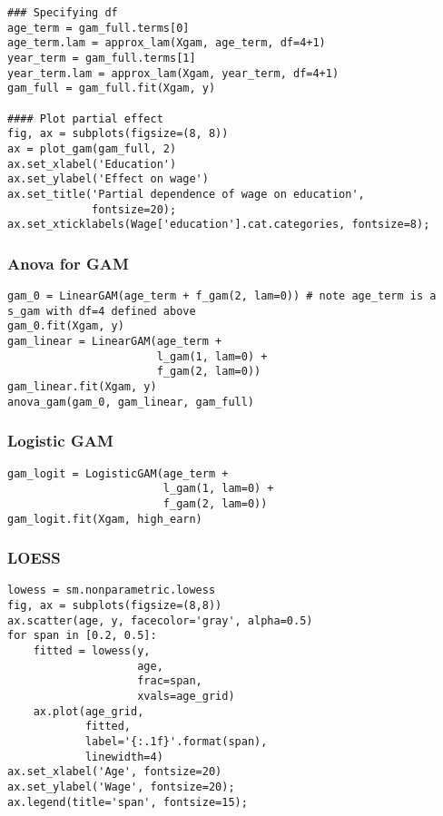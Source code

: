 \documentclass[
  letterpaper,
  DIV=11,
  numbers=noendperiod]{scrreprt}
\begin{document}
\begin{verbatim}
### Specifying df
age_term = gam_full.terms[0]
age_term.lam = approx_lam(Xgam, age_term, df=4+1)
year_term = gam_full.terms[1]
year_term.lam = approx_lam(Xgam, year_term, df=4+1)
gam_full = gam_full.fit(Xgam, y)

#### Plot partial effect
fig, ax = subplots(figsize=(8, 8))
ax = plot_gam(gam_full, 2)
ax.set_xlabel('Education')
ax.set_ylabel('Effect on wage')
ax.set_title('Partial dependence of wage on education',
             fontsize=20);
ax.set_xticklabels(Wage['education'].cat.categories, fontsize=8);
\end{verbatim}

\subsubsection{Anova for GAM}\label{anova-for-gam}

\begin{verbatim}
gam_0 = LinearGAM(age_term + f_gam(2, lam=0)) # note age_term is a s_gam with df=4 defined above 
gam_0.fit(Xgam, y)
gam_linear = LinearGAM(age_term +
                       l_gam(1, lam=0) +
                       f_gam(2, lam=0))
gam_linear.fit(Xgam, y)
anova_gam(gam_0, gam_linear, gam_full)
\end{verbatim}

\subsubsection{Logistic GAM}\label{logistic-gam}

\begin{verbatim}
gam_logit = LogisticGAM(age_term + 
                        l_gam(1, lam=0) +
                        f_gam(2, lam=0))
gam_logit.fit(Xgam, high_earn)
\end{verbatim}

\subsubsection{LOESS}\label{loess}

\begin{verbatim}
lowess = sm.nonparametric.lowess
fig, ax = subplots(figsize=(8,8))
ax.scatter(age, y, facecolor='gray', alpha=0.5)
for span in [0.2, 0.5]:
    fitted = lowess(y,
                    age,
                    frac=span,
                    xvals=age_grid)
    ax.plot(age_grid,
            fitted,
            label='{:.1f}'.format(span),
            linewidth=4)
ax.set_xlabel('Age', fontsize=20)
ax.set_ylabel('Wage', fontsize=20);
ax.legend(title='span', fontsize=15);
\end{verbatim}
\end{document}
